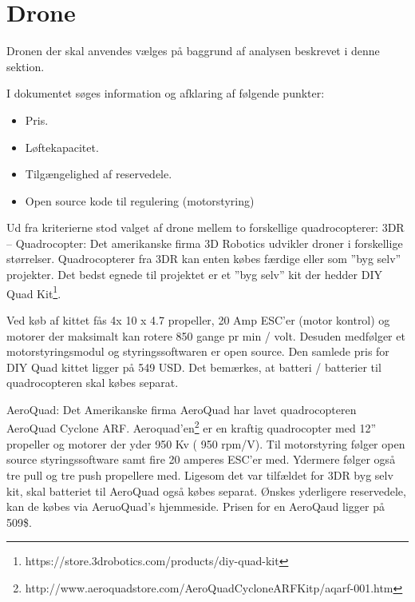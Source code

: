 \section{Drone}

Dronen der skal anvendes vælges på baggrund af analysen beskrevet i denne sektion. 

I dokumentet søges information og afklaring af følgende punkter:
\begin{itemize}
	\item Pris.
	\item Løftekapacitet. 
	\item Tilgængelighed af reservedele. 
	\item Open source kode til regulering (motorstyring)
\end{itemize}

\vspace{0.5cm}

Ud fra kriterierne stod valget af drone mellem to forskellige quadrocopterer: 
3DR – Quadrocopter:  Det amerikanske firma 3D Robotics udvikler droner i forskellige størrelser. Quadrocopterer fra 3DR kan enten købes færdige eller som ”byg selv” projekter. Det bedst egnede til projektet er et ”byg selv” kit der hedder DIY Quad Kit\footnote{https://store.3drobotics.com/products/diy-quad-kit}. 

Ved køb af kittet fås 4x 10 x 4.7 propeller, 20 Amp ESC’er (motor kontrol) og motorer der maksimalt kan rotere 850 gange pr min / volt.  Desuden medfølger et motorstyringsmodul og styringssoftwaren er open source. Den samlede pris for DIY Quad kittet ligger på 549 USD. Det bemærkes, at batteri / batterier til quadrocopteren skal købes separat.

AeroQuad: Det Amerikanske firma AeroQuad har lavet quadrocopteren AeroQuad Cyclone ARF. Aeroquad'en\footnote{http://www.aeroquadstore.com/AeroQuad\textunderscore Cyclone\textunderscore ARF\textunderscore Kit\textunderscore p/aqarf-001.htm} er en kraftig quadrocopter med 12” propeller og motorer der yder 950 Kv ( 950 rpm/V). Til motorstyring følger open source styringssoftware samt fire 20 amperes ESC'er med. Ydermere følger også tre pull og tre push propellere med. \newline Ligesom det var tilfældet for 3DR byg selv kit, skal batteriet til AeroQuad også købes separat. Ønskes yderligere reservedele, kan de købes via AeruoQuad’s hjemmeside. Prisen for en AeroQaud ligger på 509\$.

